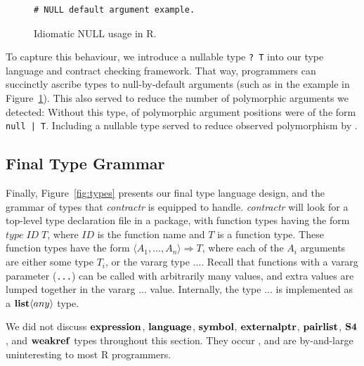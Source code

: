 \documentclass[acmsmall,review,anonymous]{acmart}\settopmatter{printfolios=true,printccs=false,printacmref=false}
\newcommand{\code}[1]{{\lstinline[style=Rin]!#1!}\xspace}
\newcommand{\contractr}{\emph{contractr}\xspace} %
\begin{document}
\begin{figure}[htbp]
\begin{center}

\begin{lstlisting}
# NULL default argument example. 
\end{lstlisting}

\caption{Idiomatic NULL usage in R.}
\label{fig:null}
\end{center}
\end{figure}

To capture this behaviour, we introduce a nullable type \code{? T} into our type language and contract checking framework.
That way, programmers can succinctly ascribe types to null-by-default arguments (such as in the example in Figure~\ref{fig:null}).
This also served to reduce the number of polymorphic arguments we detected:
Without this type,  of polymorphic argument positions were of the form \code{null | T}.
Including a nullable type served to reduce observed polymorphism by . 

%
%
%
%
\subsection{Final Type Grammar}

Finally, Figure~\ref{fig:types} presents our final type language design, and the grammar of types that \contractr is equipped to handle.
\contractr will look for a top-level type declaration file in a package, with function types having the form $type \; ID \; T$, where $ID$ is the function name and $T$ is a function type.
These function types have the form $\langle A_1 , ..., A_n\rangle \Rightarrow T$, where each of the $A_i$ arguments are either some type $T_i$, or the vararg type $...$.
Recall that functions with a vararg parameter (\code{...}) can be called with arbitrarily many values, and extra values are lumped together in the vararg $...$ value.
Internally, the type $...$ is implemented as a ${\bf list} \langle any \rangle$ type.

We did not discuss ${\bf expression}$, ${\bf language}$, ${\bf symbol}$, ${\bf externalptr}$, ${\bf pairlist}$, ${\bf S4}$, and ${\bf weakref}$ types throughout this section.
They occur , and are by-and-large uninteresting to most R programmers.

\label{subsec:typegrammar}
\end{document}
